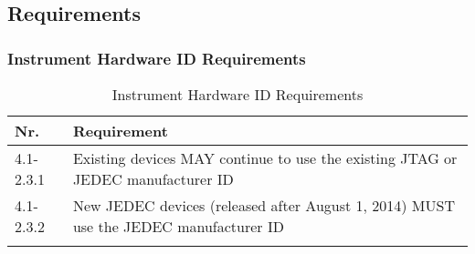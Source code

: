 \newcommand*{\tabletype}{longtable}

\subsection[KIS Requirements]{Requirements }\label{app:anhang_kis_requirements}
\subsubsection{Instrument Hardware ID Requirements}
\begin{\tabletype}[H]{|p{.12\linewidth}|p{.83\linewidth}|}
\hline
\textbf{Nr.} & \textbf{Requirement} \\ \hline 
\endhead 
4.1-2.3.1 & Existing  devices MAY continue to use the existing JTAG or JEDEC manufacturer ID \\ \hline 
4.1-2.3.2 & New  JEDEC devices (released after August 1, 2014) MUST use the  JEDEC manufacturer ID \\ \hline 
\caption {Instrument Hardware ID Requirements}
\label{tab:InstrumentHardwareIDRequirementsList}
\end{\tabletype}
